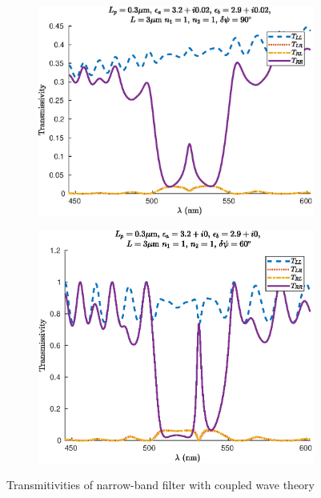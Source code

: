 \begin{figure}
\begin{subfigure}{0.49\linewidth}
		\includegraphics[width=\linewidth]{plots/defect/reflectivity_losses/cwt_transmission}
		\caption{}
	\end{subfigure}
	\begin{subfigure}{0.49\linewidth}
		\includegraphics[width=\linewidth]{plots/defect/reflectivity_other_defect/cwt_transmission}
		\caption{}
	\end{subfigure}
	\caption[Transmitivities of the narrow-band filter]{Transmitivities of narrow-band filter with coupled wave theory}
	\label{fig:transitivities_narrow_appendix}
\end{figure}

